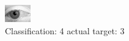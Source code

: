 \begin{figure}[h!]
\begin{center}
\includegraphics[width=0.60\columnwidth]{figures/ID2786_class_4_target_3.png}
\end{center}
\caption{ Classification: 4 actual target: 3}
\label{fig:ID2786_class_4_target_3}
\end{figure}
